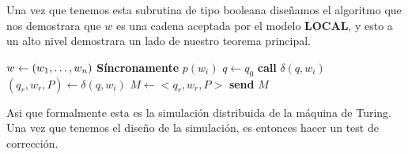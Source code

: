 \documentclass[10pt]{article}
\begin{document}
    Una vez que tenemos esta subrutina de tipo booleana diseñamos el algoritmo que nos demostrara que $w$ es una cadena
    aceptada por el modelo \textbf{LOCAL}, y esto a un alto nivel demostrara un lado de nuestro teorema principal.\\

    \begin{algorithm}
        \begin{algorithmic}
            \STATE $w\gets(w_{1},\mathellipsis, w_{n})$
            \STATE \textbf{Síncronamente}
               \STATE $p(w_{i})$
               \STATE $q\gets q_{0}$
                 \STATE \textbf{call} $\delta(q,w_{i})$
                 \STATE $(q_{r},w_{r},P) \gets \delta(q,w_{i})$
               \ENDWHILE
               \ELSE
                  \STATE $M \gets <q_{r},w_{r},P>$
                  \STATE \textbf{send} $M$
               \ENDIF
            \ENDFOR
        \end{algorithmic}
        \caption{$Simulate\char95 Algo\char95 TM(w,G,TM)$\label{lss}}
    \end{algorithm}
    Asi que formalmente esta es la simulación distribuida de la máquina de Turing.
    Una vez que tenemos el diseño de la simulación, es entonces hacer un test de corrección.
    \\\\
\end{document}
